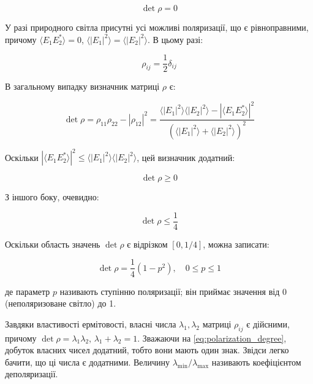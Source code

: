 \begin{equation*}
\det \rho = 0
\end{equation*}

У разі природного світла присутні усі можливі поляризації, що є рівноправними, причому \(\langle E_1 E_2^{*} \rangle = 0\), \(\langle |E_1|^2 \rangle =
\langle |E_2|^2 \rangle\). В цьому разі:

\begin{equation*}
\rho_{ij} = \frac{1}{2} \delta_{ij}
\end{equation*}

В загальному випадку визначник матриці \(\rho\) є:

\begin{equation*}
\det \rho = \rho_{11} \rho_{22} - |\rho_{12}|^2 = \frac{\langle |E_1|^2 \rangle \langle |E_2|^2 \rangle - |\langle E_1 E_2^{*} \rangle|^2}{\left(
\langle |E_1|^2 \rangle + \langle |E_2|^2 \rangle \right)^2}
\end{equation*}

Оскільки \(|\langle E_1 E_2^{*} \rangle|^2 \leq \langle |E_1|^2 \rangle \langle |E_2|^2 \rangle\), цей визначник додатний:

\begin{equation*}
\det \rho \geq 0
\end{equation*}

З іншого боку, очевидно:

\begin{equation*}
\det \rho \leq \frac{1}{4}
\end{equation*}

Оскільки область значень \(\det \rho\) є відрізком \([0, 1/4]\), можна записати:

\begin{equation}
\det \rho = \frac{1}{4} \left( 1 - p^2 \right), \quad 0 \leq p \leq 1
\label{eq:polarization_degree}
\end{equation}

де параметр \(p\) називають ступінню поляризації; він приймає значення від 0 (неполяризоване світло) до 1.

Завдяки властивості ермітовості, власні числа \(\lambda_1, \lambda_2\) матриці \(\rho_{ij}\) є дійсними, причому \(\det \rho = \lambda_1 \lambda_2\),
\(\lambda_1 + \lambda_2 = 1\). Зважаючи на \eqref{eq:polarization_degree}, добуток власних чисел додатний, тобто вони мають один знак. Звідси легко
бачити, що ці числа є додатними. Величину \(\lambda_{\min}/\lambda_{\max}\) називають коефіцієнтом деполяризації.

